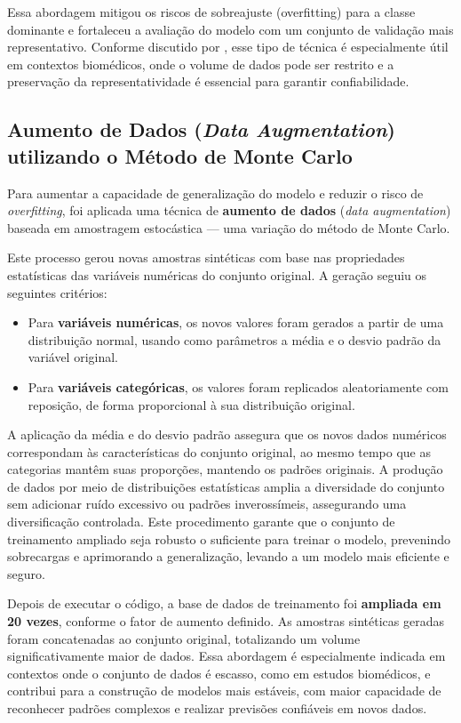 Essa abordagem mitigou os riscos de sobreajuste (overfitting) para a classe dominante e fortaleceu a avaliação do modelo com um conjunto de validação mais representativo. Conforme discutido por , esse tipo de técnica é especialmente útil em contextos biomédicos, onde o volume de dados pode ser restrito e a preservação da representatividade é essencial para garantir confiabilidade. 

\subsection*{Aumento de Dados (\textit{Data Augmentation}) utilizando o Método de Monte Carlo} 
Para aumentar a capacidade de generalização do modelo e reduzir o risco de \textit{overfitting}, foi aplicada uma técnica de \textbf{aumento de dados} (\textit{data augmentation}) baseada em amostragem estocástica — uma variação do método de Monte Carlo.

Este processo gerou novas amostras sintéticas com base nas propriedades estatísticas das variáveis numéricas do conjunto original. A geração seguiu os seguintes critérios:
\begin{itemize}
    \item Para \textbf{variáveis numéricas}, os novos valores foram gerados a partir de uma distribuição normal, usando como parâmetros a média e o desvio padrão da variável original.
    \item Para \textbf{variáveis categóricas}, os valores foram replicados aleatoriamente com reposição, de forma proporcional à sua distribuição original.
\end{itemize}

A aplicação da média e do desvio padrão assegura que os novos dados numéricos correspondam às características do conjunto original, ao mesmo tempo que as categorias mantêm suas proporções, mantendo os padrões originais. A produção de dados por meio de distribuições estatísticas amplia a diversidade do conjunto sem adicionar ruído excessivo ou padrões inverossímeis, assegurando uma diversificação controlada. Este procedimento garante que o conjunto de treinamento ampliado seja robusto o suficiente para treinar o modelo, prevenindo sobrecargas e aprimorando a generalização, levando a um modelo mais eficiente e seguro.

Depois de executar o código, a base de dados de treinamento foi  \textbf{ampliada em 20 vezes}, conforme o fator de aumento definido. As amostras sintéticas geradas foram concatenadas ao conjunto original, totalizando um volume significativamente maior de dados. Essa abordagem é especialmente indicada em contextos onde o conjunto de dados é escasso, como em estudos biomédicos, e contribui para a construção de modelos mais estáveis, com maior capacidade de reconhecer padrões complexos e realizar previsões confiáveis em novos dados.


